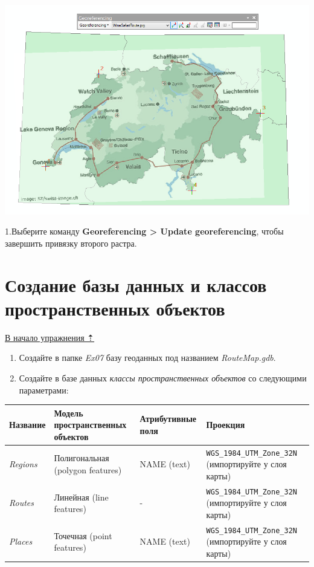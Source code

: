 \documentclass[]{book}
\theoremstyle{definition}
\theoremstyle{definition}
\theoremstyle{definition}
\theoremstyle{remark}
\begin{document}
\begin{enumerate}
  \includegraphics{images/Ex07/image13.png}
\end{enumerate}

1.Выберите команду \textbf{Georeferencing \textgreater{} Update
georeferencing}, чтобы завершить привязку второго растра.

\hypertarget{map-ref-general-geodatabase}{%
\section{Создание базы данных и классов пространственных
объектов}\label{map-ref-general-geodatabase}}

\protect\hyperlink{map-ref-general}{В начало упражнения ⇡}

\begin{enumerate}
\def\labelenumi{\arabic{enumi}.}
\item
  Создайте в папке \emph{Ex07} базу геоданных под названием
  \emph{RouteMap.gdb}.
\item
  Создайте в базе данных \emph{классы пространственных объектов} со
  следующими параметрами:
\end{enumerate}

\begin{longtable}[]{@{}llll@{}}
\toprule
Название & Модель пространственных объектов & Атрибутивные поля &
Проекция\tabularnewline
\midrule
\endhead
\emph{Regions} & Полигональная (polygon features) & NAME (text) &
\texttt{WGS\_1984\_UTM\_Zone\_32N} (импортируйте у слоя
карты)\tabularnewline
\emph{Routes} & Линейная (line features) & - &
\texttt{WGS\_1984\_UTM\_Zone\_32N} (импортируйте у слоя
карты)\tabularnewline
\emph{Places} & Точечная (point features) & NAME (text) &
\texttt{WGS\_1984\_UTM\_Zone\_32N} (импортируйте у слоя
карты)\tabularnewline
\bottomrule
\end{longtable}
\end{document}
